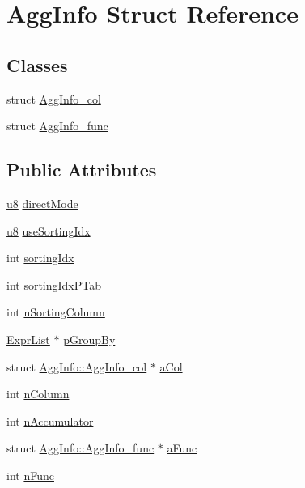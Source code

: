 \hypertarget{struct_agg_info}{\section{Agg\-Info Struct Reference}
\label{struct_agg_info}
}
\subsection*{Classes}
\begin{DoxyCompactItemize}
\item 
struct \hyperlink{struct_agg_info_1_1_agg_info__col}{Agg\-Info\-\_\-col}
\item 
struct \hyperlink{struct_agg_info_1_1_agg_info__func}{Agg\-Info\-\_\-func}
\end{DoxyCompactItemize}
\subsection*{Public Attributes}
\begin{DoxyCompactItemize}
\item 
\hyperlink{sqlite3_8c_a74a0f6424ae628af25f23f0a35f6ead3}{u8} \hyperlink{struct_agg_info_aaa57d294016ac7e17e7cacaa7b25634e}{direct\-Mode}
\item 
\hyperlink{sqlite3_8c_a74a0f6424ae628af25f23f0a35f6ead3}{u8} \hyperlink{struct_agg_info_a8173a7ea13c4a12ce4befbcb40719073}{use\-Sorting\-Idx}
\item 
int \hyperlink{struct_agg_info_a97ce74f509ca908a616c123e7196797b}{sorting\-Idx}
\item 
int \hyperlink{struct_agg_info_a7faac4c3996598960fc46f0c173b244c}{sorting\-Idx\-P\-Tab}
\item 
int \hyperlink{struct_agg_info_a89925dccd1a0ec51d2a5a5dbaead66dc}{n\-Sorting\-Column}
\item 
\hyperlink{struct_expr_list}{Expr\-List} $\ast$ \hyperlink{struct_agg_info_aa8e942103d224c4db847743670907781}{p\-Group\-By}
\item 
struct \hyperlink{struct_agg_info_1_1_agg_info__col}{Agg\-Info\-::\-Agg\-Info\-\_\-col} $\ast$ \hyperlink{struct_agg_info_a52fa1a7eb3145c27be13b2bcccd57d62}{a\-Col}
\item 
int \hyperlink{struct_agg_info_a9cbfa5fc33328cf3500426674e036a8b}{n\-Column}
\item 
int \hyperlink{struct_agg_info_ad2251760d95af9024f0a3170405cb53b}{n\-Accumulator}
\item 
struct \hyperlink{struct_agg_info_1_1_agg_info__func}{Agg\-Info\-::\-Agg\-Info\-\_\-func} $\ast$ \hyperlink{struct_agg_info_a4e201acd6a1f8aed360c58e45f47c803}{a\-Func}
\item 
int \hyperlink{struct_agg_info_a5bfde7ca00d28da6edbda523ab038e38}{n\-Func}
\end{DoxyCompactItemize}


